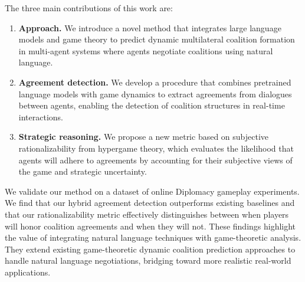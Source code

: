 The three main contributions of this work are:
\begin{enumerate}
	\item \textbf{Approach.} We introduce a novel method that integrates large language models and game theory to predict dynamic multilateral coalition formation in multi-agent systems where agents negotiate coalitions using natural language.
	
	\item \textbf{Agreement detection.} We develop a procedure that combines pretrained language models with game dynamics to extract agreements from dialogues between agents, enabling the detection of coalition structures in real-time interactions.
	
	\item \textbf{Strategic reasoning.} We propose a new metric based on subjective rationalizability from hypergame theory, which evaluates the likelihood that agents will adhere to agreements by accounting for their subjective views of the game and strategic uncertainty.
\end{enumerate}

We validate our method on a dataset of online Diplomacy gameplay experiments.
We find that our hybrid agreement detection outperforms existing baselines and that our rationalizability metric effectively distinguishes between when players will honor coalition agreements and when they will not.
These findings highlight the value of integrating natural language techniques with game-theoretic analysis. 
They extend existing game-theoretic dynamic coalition prediction approaches to handle natural language negotiations, bridging toward more realistic real-world applications.



